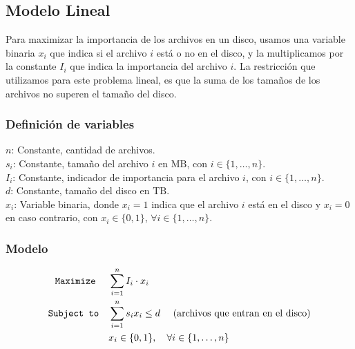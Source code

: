 \documentclass[11pt, a4paper, pdftex]{article}
\begin{document}
\subsection{Modelo Lineal}

Para maximizar la importancia de los archivos en un disco, usamos una
variable binaria $x_i$ que indica si el archivo $i$ está o no en el
disco, y la multiplicamos por la constante $I_{i}$ que indica la
importancia del archivo $i$. La restricción que utilizamos para este
problema lineal, es que la suma de los tamaños de los archivos no superen
el tamaño del disco. 

\subsubsection{Definición de variables}


\noindent $n$: Constante, cantidad de archivos. \\

\noindent $s_{i}$: Constante, tamaño del archivo $i$ en $\text{MB}$, con $i \in \{1, \ldots, n\}$. \\

\noindent $I_{i}$: Constante, indicador de importancia para el archivo $i$, con $i \in \{1, \ldots, n\}$. \\

\noindent $d$: Constante, tamaño del disco en $\text{TB}$. \\

\noindent $x_{i}$: Variable binaria, donde $x_{i} = 1$ indica que el archivo $i$ está en el disco y $x_{i} = 0$ en caso contrario, con $x_{i} \in \{0, 1\}$, $\forall i \in \{1, \ldots, n\}$. \\


\subsubsection{Modelo}

\begin{alignat*}{2}
	\texttt{Maximize}\quad\,\,
	& \sum_{i = 1}^{n} I_{i} \cdot x_{i}\\
	\texttt{Subject to}\quad
	& \sum_{i = 1}^{n} s_{i} x_{i} \le d\ \quad\text{(archivos que entran en el disco)}\\
	& x_{i} \in \{0,1\}, \quad \forall i \in \{1, \ldots, n\} \\
\end{alignat*}
\end{document}

